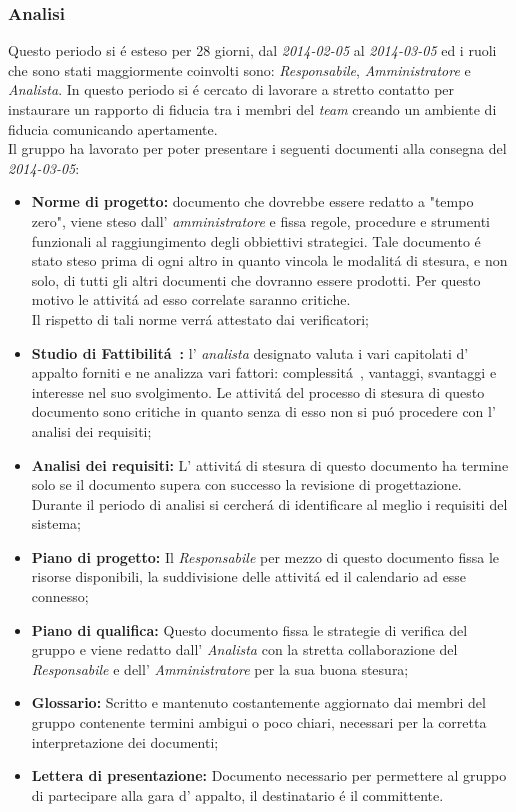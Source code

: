 \subsubsection{Analisi}
Questo periodo si \'e esteso per 28 giorni, dal \textit{2014-02-05} al \textit{2014-03-05} ed i ruoli che sono stati maggiormente coinvolti sono: \textit{Responsabile}, \textit{Amministratore} e \textit{Analista}.
In questo periodo si \'e cercato di lavorare a stretto contatto per instaurare un rapporto di fiducia tra i membri del \textit{team} creando un ambiente di fiducia comunicando apertamente.
\\
Il gruppo \gruppo ha lavorato per poter presentare i seguenti documenti alla consegna del \textit{2014-03-05}:
\begin{itemize}
	\item \textbf{Norme di progetto:} documento che dovrebbe essere redatto a "tempo zero", viene steso dall' \textit{amministratore} e fissa regole, procedure e strumenti funzionali al raggiungimento degli obbiettivi strategici. Tale documento \'e stato steso prima di ogni altro in quanto vincola le modalit\'a di stesura, e non solo, di tutti gli altri documenti che dovranno essere prodotti. Per questo motivo le attivit\'a ad esso correlate saranno critiche.
	\\ Il rispetto di tali norme verr\'a attestato dai verificatori;
	\item \textbf{Studio di Fattibilit\'a~:} l' \textit{analista} designato valuta i vari capitolati d' appalto forniti e ne analizza vari fattori: complessit\'a~, vantaggi, svantaggi e interesse nel suo svolgimento. Le attivit\'a del processo di stesura di questo documento sono critiche in quanto senza di esso non si pu\'o procedere con l' analisi dei requisiti;
	\item \textbf{Analisi dei requisiti:} L' attivit\'a di stesura di questo documento ha termine solo se il documento supera con successo la revisione di progettazione. Durante il periodo di analisi si cercher\'a di identificare al meglio i requisiti del sistema;
	\item \textbf{Piano di progetto:} Il \textit{Responsabile} per mezzo di questo documento fissa le risorse disponibili, la suddivisione delle attivit\'a ed il calendario ad esse connesso; 
	\item \textbf{Piano di qualifica:} Questo documento fissa le strategie di verifica del gruppo e viene redatto dall' \textit{Analista} con la stretta collaborazione del \textit{Responsabile} e dell' \textit{Amministratore} per la sua buona stesura;
	\item \textbf{Glossario:} Scritto e mantenuto costantemente aggiornato dai membri del gruppo contenente termini ambigui o poco chiari, necessari per la corretta interpretazione dei documenti;
	\item \textbf{Lettera di presentazione:} Documento necessario per permettere al gruppo di partecipare alla gara d' appalto, il destinatario \'e il committente.
\end{itemize}
